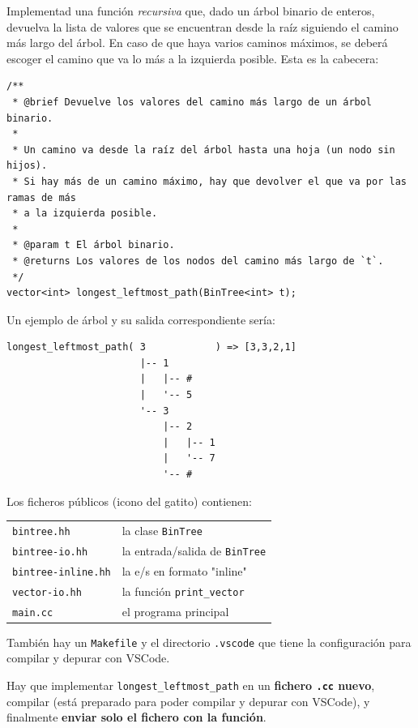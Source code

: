 
\Statement

Implementad una función \emph{recursiva} que, dado un árbol binario de enteros, devuelva la lista de valores que se encuentran desde la raíz siguiendo el camino más largo del árbol. En caso de que haya varios caminos máximos, se deberá escoger el camino que va lo más a la izquierda posible. Esta es la cabecera:

\begin{verbatim}
/**
 * @brief Devuelve los valores del camino más largo de un árbol binario.
 *
 * Un camino va desde la raíz del árbol hasta una hoja (un nodo sin hijos).
 * Si hay más de un camino máximo, hay que devolver el que va por las ramas de más
 * a la izquierda posible.
 *
 * @param t El árbol binario.
 * @returns Los valores de los nodos del camino más largo de `t`.
 */
vector<int> longest_leftmost_path(BinTree<int> t);
\end{verbatim}

Un ejemplo de árbol y su salida correspondiente sería:

\begin{verbatim}
longest_leftmost_path( 3            ) => [3,3,2,1]
                       |-- 1        
                       |   |-- #    
                       |   '-- 5    
                       '-- 3        
                           |-- 2    
                           |   |-- 1
                           |   '-- 7
                           '-- #    
\end{verbatim}

Los ficheros públicos (icono del gatito) contienen:
\smallskip
\begin{tabular}{ll}
 \verb|bintree.hh| & la clase \verb|BinTree| \\
 \verb|bintree-io.hh| & la entrada/salida de \verb|BinTree| \\
 \verb|bintree-inline.hh| & la e/s en formato "inline" \\
 \verb|vector-io.hh| & la función \verb|print_vector| \\
 \verb|main.cc| & el programa principal \\
\end{tabular}

También hay un \verb|Makefile| y el directorio \verb|.vscode| que tiene la configuración para compilar y depurar con VSCode.

\medskip

Hay que implementar \verb|longest_leftmost_path| en un \textbf{fichero \texttt{.cc} nuevo}, compilar (está preparado para poder compilar y depurar con VSCode), y finalmente \textbf{enviar solo el fichero con la función}.

